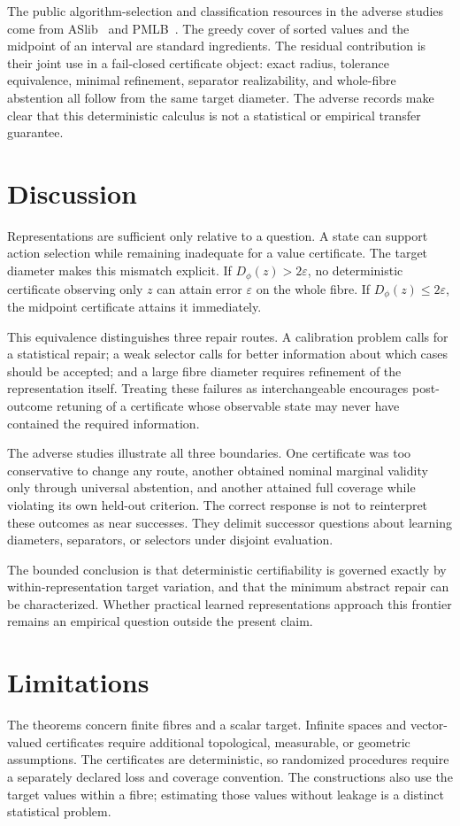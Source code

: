 \documentclass[10pt]{article}
\newcommand{\1}{\mathbf{1}}
\begin{document}
The public algorithm-selection and classification resources in the adverse studies come from ASlib~\citep{bischl2016} and PMLB~\citep{olson2017}. The greedy cover of sorted values and the midpoint of an interval are standard ingredients. The residual contribution is their joint use in a fail-closed certificate object: exact radius, tolerance equivalence, minimal refinement, separator realizability, and whole-fibre abstention all follow from the same target diameter. The adverse records make clear that this deterministic calculus is not a statistical or empirical transfer guarantee.

\section{Discussion}
Representations are sufficient only relative to a question. A state can support action selection while remaining inadequate for a value certificate. The target diameter makes this mismatch explicit. If $D_\phi(z)>2\varepsilon$, no deterministic certificate observing only $z$ can attain error $\varepsilon$ on the whole fibre. If $D_\phi(z)\leq2\varepsilon$, the midpoint certificate attains it immediately.

This equivalence distinguishes three repair routes. A calibration problem calls for a statistical repair; a weak selector calls for better information about which cases should be accepted; and a large fibre diameter requires refinement of the representation itself. Treating these failures as interchangeable encourages post-outcome retuning of a certificate whose observable state may never have contained the required information.

The adverse studies illustrate all three boundaries. One certificate was too conservative to change any route, another obtained nominal marginal validity only through universal abstention, and another attained full coverage while violating its own held-out criterion. The correct response is not to reinterpret these outcomes as near successes. They delimit successor questions about learning diameters, separators, or selectors under disjoint evaluation.

The bounded conclusion is that deterministic certifiability is governed exactly by within-representation target variation, and that the minimum abstract repair can be characterized. Whether practical learned representations approach this frontier remains an empirical question outside the present claim.

\section{Limitations}
The theorems concern finite fibres and a scalar target. Infinite spaces and vector-valued certificates require additional topological, measurable, or geometric assumptions. The certificates are deterministic, so randomized procedures require a separately declared loss and coverage convention. The constructions also use the target values within a fibre; estimating those values without leakage is a distinct statistical problem.
\end{document}
